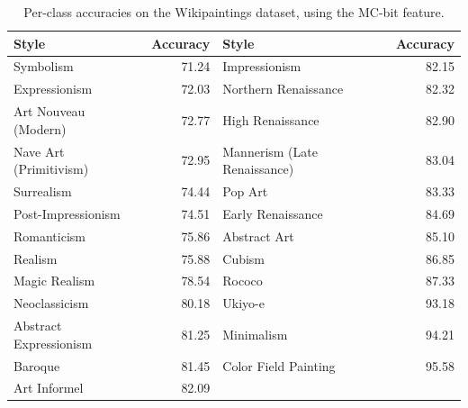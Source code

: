 \begin{table}
\caption{
    Per-class accuracies on the Wikipaintings dataset, using the MC-bit feature.
}\label{tab:wp_accuracies}
\vspace{1em}
\centering
\begin{tabular}{lrlr}
\toprule
\textbf{Style} & \textbf{Accuracy} & \textbf{Style} & \textbf{Accuracy} \\
\midrule
Symbolism                    &         71.24 & Impressionism                &         82.15 \\
Expressionism                &         72.03 & Northern Renaissance         &         82.32 \\
Art Nouveau (Modern)         &         72.77 & High Renaissance             &         82.90 \\
Nave Art (Primitivism)       &         72.95 & Mannerism (Late Renaissance) &         83.04 \\
Surrealism                   &         74.44 & Pop Art                      &         83.33 \\
Post-Impressionism           &         74.51 & Early Renaissance            &         84.69 \\
Romanticism                  &         75.86 & Abstract Art                 &         85.10 \\
Realism                      &         75.88 & Cubism                       &         86.85 \\
Magic Realism                &         78.54 & Rococo                       &         87.33 \\
Neoclassicism                &         80.18 & Ukiyo-e                      &         93.18 \\
Abstract Expressionism       &         81.25 & Minimalism                   &         94.21 \\
Baroque                      &         81.45 & Color Field Painting         &         95.58 \\
Art Informel                 &         82.09 &                              &               \\
\bottomrule
\end{tabular}
\end{table}


